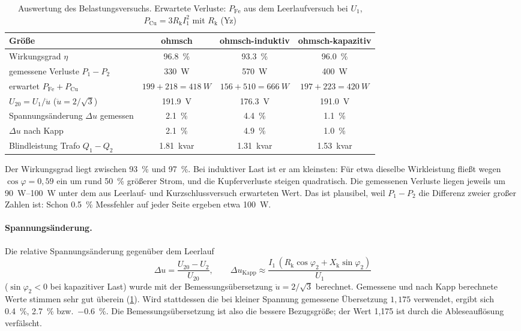 \documentclass[a4paper,11pt]{scrreprt}
\newcommand{\ue}{\ddot{u}}
\begin{document}
\begin{table}[H]
\centering
\caption{Auswertung des Belastungsversuchs. Erwartete Verluste: $P_\mathrm{Fe}$ aus dem Leerlaufversuch bei $U_1$, $P_\mathrm{Cu}=3R_\mathrm{k}I_1^2$ mit $R_\mathrm{k}$ (Yz)}
\label{tab:bel2}
\begin{tabular}{@{}lccc@{}}
\toprule
Größe & ohmsch & ohmsch-induktiv & ohmsch-kapazitiv\\
\midrule
Wirkungsgrad $\eta$ & \SI{96.8}{\percent} & \SI{93.3}{\percent} & \SI{96.0}{\percent}\\
gemessene Verluste $P_1-P_2$ & \SI{330}{W} & \SI{570}{W} & \SI{400}{W}\\
erwartet $P_\mathrm{Fe}+P_\mathrm{Cu}$ & $199+218=\SI{418}{W}$ & $156+510=\SI{666}{W}$ & $197+223=\SI{420}{W}$\\
\midrule
$U_{20} = U_1/\ue$ ($\ue = 2/\sqrt3$) & \SI{191.9}{V} & \SI{176.3}{V} & \SI{191.0}{V}\\
Spannungsänderung $\Delta u$ gemessen & \SI{2.1}{\percent} & \SI{4.4}{\percent} & \SI{1.1}{\percent}\\
$\Delta u$ nach Kapp & \SI{2.1}{\percent} & \SI{4.9}{\percent} & \SI{1.0}{\percent}\\
\midrule
Blindleistung Trafo $Q_1 - Q_2$ & \SI{1.81}{kvar} & \SI{1.31}{kvar} & \SI{1.53}{kvar}\\
\bottomrule
\end{tabular}
\end{table}

Der Wirkungsgrad liegt zwischen \SI{93}{\percent} und \SI{97}{\percent}. Bei induktiver Last ist er am kleinsten: Für etwa dieselbe Wirkleistung fließt wegen $\cos\varphi = 0{,}59$ ein um rund \SI{50}{\percent} größerer Strom, und die Kupferverluste steigen quadratisch. Die gemessenen Verluste liegen jeweils um \SIrange{90}{100}{W} unter dem aus Leerlauf- und Kurzschlussversuch erwarteten Wert. Das ist plausibel, weil $P_1-P_2$ die Differenz zweier großer Zahlen ist: Schon \SI{0.5}{\percent} Messfehler auf jeder Seite ergeben etwa \SI{100}{W}.

\paragraph{Spannungsänderung.} Die relative Spannungsänderung gegenüber dem Leerlauf
\begin{equation}
  \Delta u = \frac{U_{20} - U_2}{U_{20}}, \qquad
  \Delta u_\mathrm{Kapp} \approx \frac{I_1\,(R_\mathrm{k}\cos\varphi_2 + X_\mathrm{k}\sin\varphi_2)}{U_1}
\end{equation}
($\sin\varphi_2 < 0$ bei kapazitiver Last) wurde mit der Bemessungsübersetzung $\ue=2/\sqrt3$ berechnet. Gemessene und nach Kapp berechnete Werte stimmen sehr gut überein (\cref{tab:bel2}). Wird stattdessen die bei kleiner Spannung gemessene Übersetzung $1{,}175$ verwendet, ergibt sich \SI{0.4}{\percent}, \SI{2.7}{\percent} bzw.\ \SI{-0.6}{\percent}. Die Bemessungsübersetzung ist also die bessere Bezugsgröße; der Wert 1,175 ist durch die Ableseauflösung verfälscht.
\end{document}
